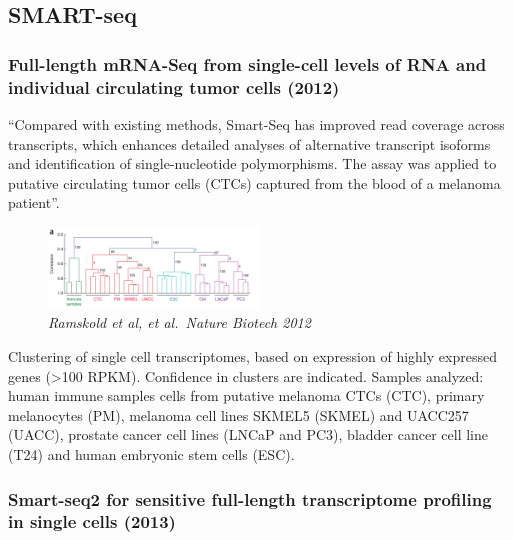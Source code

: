 \hypertarget{smart-seq}{%
\subsection{SMART-seq}\label{smart-seq}}

\hypertarget{full-length-mrna-seq-from-single-cell-levels-of-rna-and-individual-circulating-tumor-cells-2012}{%
\subsubsection{Full-length mRNA-Seq from single-cell levels of RNA and
individual circulating tumor cells
(2012)}\label{full-length-mrna-seq-from-single-cell-levels-of-rna-and-individual-circulating-tumor-cells-2012}}

``Compared with existing methods, Smart-Seq has improved read coverage
across transcripts, which enhances detailed analyses of alternative
transcript isoforms and identification of single-nucleotide
polymorphisms. The assay was applied to putative circulating tumor cells
(CTCs) captured from the blood of a melanoma patient''.

\begin{figure}
\centering
\includegraphics[width=0.5\textwidth]{images/Screen_Shot_2023-02-21_at_19-30-18.png}
\caption{\emph{Ramskold et al, et al.~Nature Biotech 2012}}
\end{figure}

Clustering of single cell transcriptomes, based on expression of highly
expressed genes (\textgreater100 RPKM). Confidence in clusters are
indicated. Samples analyzed: human immune samples cells from putative
melanoma CTCs (CTC), primary melanocytes (PM), melanoma cell lines
SKMEL5 (SKMEL) and UACC257 (UACC), prostate cancer cell lines (LNCaP and
PC3), bladder cancer cell line (T24) and human embryonic stem cells
(ESC).

\hypertarget{smart-seq2-for-sensitive-full-length-transcriptome-profiling-in-single-cells-2013}{%
\subsubsection{Smart-seq2 for sensitive full-length transcriptome
profiling in single cells
(2013)}\label{smart-seq2-for-sensitive-full-length-transcriptome-profiling-in-single-cells-2013}}


